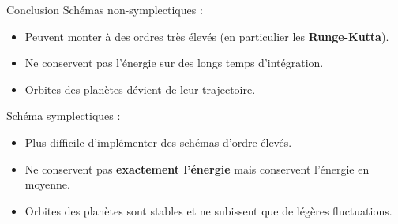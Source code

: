 \documentclass[10pt]{beamer}
\begin{document}
\begin{frame}{Conclusion}
  Schémas non-symplectiques :
  \begin{itemize}
    \item Peuvent monter à des ordres très élevés (en particulier les \textbf{Runge-Kutta}).
    \item Ne conservent pas l'énergie sur des longs temps d'intégration.
    \item Orbites des planètes dévient de leur trajectoire.
  \end{itemize}

  Schéma symplectiques :
  \begin{itemize}
    \item Plus difficile d'implémenter des schémas d'ordre élevés.
    \item Ne conservent pas \textbf{exactement l'énergie} mais conservent l'énergie en moyenne.
    \item Orbites des planètes sont stables et ne subissent que de légères fluctuations.
  \end{itemize}
\end{frame}
\end{document}
